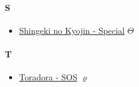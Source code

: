 		\paragraph{S} \hypertarget{SPS}{}
			\begin{itemize}
				
				\item  \href{https://mega.nz/#F!AXg1RaYB!armUYt85W4kg5kFpWfU80Q} {Shingeki no Kyojin - Special} $\varTheta$   \\ 
				
				
			\end{itemize}
		
		\paragraph{T} \hypertarget{SPT}{}
			\begin{itemize}
				
				\item  \href{https://mega.nz/#!8WomiQJS!yTakDbVKHpOt52A1MjxOTNn5h8H2vuRInmNPhdd-qaw} {Toradora - SOS} $\varrho$   \\ 
				
				
			\end{itemize}